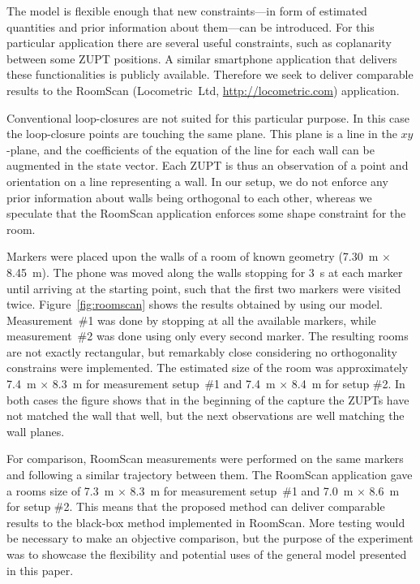 \documentclass[conference]{ieeetran}
\begin{document}
The model is flexible enough that new constraints---in form of estimated quantities and prior information about them---can be introduced. For this particular application there are several useful constraints, such as coplanarity between some ZUPT positions. A similar smartphone application that delivers these functionalities is publicly available. Therefore we seek to deliver comparable results to the RoomScan (Locometric~Ltd, \url{http://locometric.com}) application.

Conventional loop-closures are not suited for this particular purpose. In this case the loop-closure points are touching the same plane. This plane is a line in the $xy$-plane, and the coefficients of the equation of the line for each wall can be augmented in the state vector. Each ZUPT is thus an observation of a point and orientation on a line representing a wall. In our setup, we do not enforce any prior information about walls being orthogonal to each other, whereas we speculate that the RoomScan application enforces some shape constraint for the room.

Markers were placed upon the walls of a room of known geometry (7.30~m $\times$ 8.45~m). The phone was moved along the walls stopping for 3~s at each marker until arriving at the starting point, such that the first two markers were visited twice.
Figure~\ref{fig:roomscan} shows the results obtained by using our model. Measurement~\#1 was done by stopping at all the available markers, while measurement~\#2 was done using only every second marker. The resulting rooms are not exactly rectangular, but remarkably close considering no orthogonality constrains were implemented. The estimated size of the room was approximately 7.4~m $\times$ 8.3~m for measurement setup~\#1 and 7.4~m $\times$  8.4~m for setup \#2. In both cases the figure shows that in the beginning of the capture the ZUPTs have not matched the wall that well, but the next observations are well matching the wall planes.

For comparison, RoomScan measurements were performed on the same markers and following a similar trajectory between them. The RoomScan application gave a rooms size of 7.3~m $\times$ 8.3~m for measurement setup~\#1 and 7.0~m $\times$ 8.6~m for setup \#2. This means that the proposed method can deliver comparable results to the black-box method implemented in RoomScan. More testing would be necessary to make an objective comparison, but the purpose of the experiment was to showcase the flexibility and potential uses of the general model presented in this paper.
\end{document}

